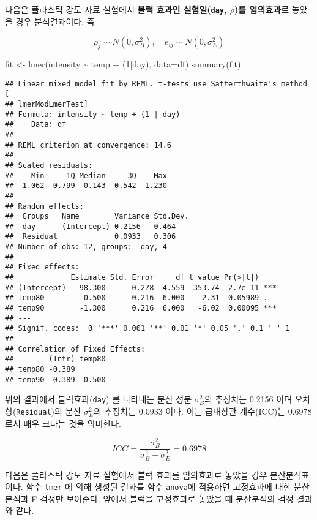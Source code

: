 \documentclass[
]{book}
\newenvironment{Shaded}{\begin{snugshade}}{\end{snugshade}}
\newcommand{\AttributeTok}[1]{\textcolor[rgb]{0.77,0.63,0.00}{#1}}
\newcommand{\DecValTok}[1]{\textcolor[rgb]{0.00,0.00,0.81}{#1}}
\newcommand{\FunctionTok}[1]{\textcolor[rgb]{0.00,0.00,0.00}{#1}}
\newcommand{\NormalTok}[1]{#1}
\newcommand{\OtherTok}[1]{\textcolor[rgb]{0.56,0.35,0.01}{#1}}
\newcommand{\SpecialCharTok}[1]{\textcolor[rgb]{0.00,0.00,0.00}{#1}}
\begin{document}
다음은 플라스틱 강도 자료 실험에서 \textbf{블럭 효과인 실험일(\texttt{day}, \(\rho\))를 임의효과}로 놓았을 경우 분석결과이다. 즉

\[ \rho_j \sim N(0, \sigma_B^2), \quad e_{ij} \sim N(0, \sigma_E^2) \]

\begin{Shaded}
\begin{Highlighting}[]
\NormalTok{fit }\OtherTok{\textless{}{-}} \FunctionTok{lmer}\NormalTok{(intensity }\SpecialCharTok{\textasciitilde{}}\NormalTok{ temp }\SpecialCharTok{+}\NormalTok{ (}\DecValTok{1}\SpecialCharTok{|}\NormalTok{day), }\AttributeTok{data=}\NormalTok{df)}
\FunctionTok{summary}\NormalTok{(fit)}
\end{Highlighting}
\end{Shaded}

\begin{verbatim}
## Linear mixed model fit by REML. t-tests use Satterthwaite's method [
## lmerModLmerTest]
## Formula: intensity ~ temp + (1 | day)
##    Data: df
## 
## REML criterion at convergence: 14.6
## 
## Scaled residuals: 
##    Min     1Q Median     3Q    Max 
## -1.062 -0.799  0.143  0.542  1.230 
## 
## Random effects:
##  Groups   Name        Variance Std.Dev.
##  day      (Intercept) 0.2156   0.464   
##  Residual             0.0933   0.306   
## Number of obs: 12, groups:  day, 4
## 
## Fixed effects:
##             Estimate Std. Error     df t value Pr(>|t|)    
## (Intercept)   98.300      0.278  4.559  353.74  2.7e-11 ***
## temp80        -0.500      0.216  6.000   -2.31  0.05989 .  
## temp90        -1.300      0.216  6.000   -6.02  0.00095 ***
## ---
## Signif. codes:  0 '***' 0.001 '**' 0.01 '*' 0.05 '.' 0.1 ' ' 1
## 
## Correlation of Fixed Effects:
##        (Intr) temp80
## temp80 -0.389       
## temp90 -0.389  0.500
\end{verbatim}

위의 결과에서 블럭효과(\texttt{day}) 를 나타내는 분산 성분 \(\sigma_B^2\)의 추정치는 0.2156 이며 오차항(\texttt{Residual})의 분산 \(\sigma_E^2\)의 추정치는 0.0933 이다. 이는 급내상관 계수(ICC)는 0.6978 로서 매우 크다는 것을 의미한다.

\[ ICC = \frac{\sigma_B^2}{\sigma_B^2 + \sigma_E^2} =  0.6978 \]

다음은 플라스틱 강도 자료 실험에서 블럭 효과를 임의효과로 놓았을 경우 분산분석표이다.
함수 \texttt{lmer} 에 의해 생성된 결과를 함수 \texttt{anova}에 적용하면 고정효과에 대한 분산분석과 F-검정만 보여준다. 앞에서 블럭을 고정효과로 놓았을 때 분산분석의 검정 결과와 같다.
\end{document}
